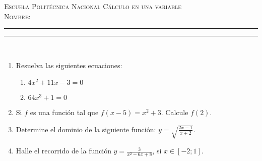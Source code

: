 \documentclass[11pt,a4paper,oneside]{article}\usepackage[]{graphicx}\usepackage[]{color}
\begin{document}
\thispagestyle{empty}
{\sf
{\Large \scshape Escuela Polit\'{e}cnica Nacional} \hfill {\scshape C\'{a}lculo en una variable}\\[7mm]
{\scshape Nombre:} \rule{0.6\textwidth}{0.5pt} \rule{0.1\textwidth}{0.5pt}\\
}











\begin{enumerate}
      \item Resuelva las siguientes ecuaciones:
\begin{enumerate}
  \item $4x^2 +11x-3=0$\\[15mm]
  \item $64x^3 +1=0$\\[15mm]
\end{enumerate}
      
      \item Si $f$ es una funci\'{o}n tal que $f(x-5)=x^2+3$. Calcule $f(2)$.\\[25mm]
      
      \item Determine el dominio de la siguiente funci\'{o}n: $y=\sqrt{\displaystyle\frac{2x-1}{ x+2}}$.\\[45mm]
      
      \item Halle el recorrido de la funci\'{o}n $y=\displaystyle\frac{3}{x^2-6x+8}$, si $x\in [-2; 1]$.\\[40mm]
      

\end{enumerate}
\end{document}
